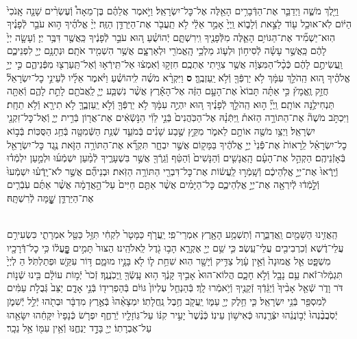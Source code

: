 \documentclass[twoside, openany, parskip=half, 11pt]{book}
\begin{document}
\begin{footnotesize}
\begin{multicols}{2}
\\
וַיֵּ֖לֶךְ מֹשֶׁ֑ה וַיְדַבֵּ֛ר אֶת־הַדְּֿבָרִ֥ים הָאֵ֖לֶּה אֶל־כׇּל־יִשְׂרָאֵֽל׃ וַיֹּ֣אמֶר אֲלֵהֶ֗ם בֶּן־מֵאָה֩ וְֿעֶשְׂרִ֨ים שָׁנָ֤ה אָֽנֹכִי֙ הַיּ֔וֹם לֹֽא־אוּכַ֥ל ע֖וֹד לָצֵ֣את וְֿלָב֑וֹא וַֽיְיָ֙ אָמַ֣ר אֵלַ֔י לֹ֥א תַֽעֲבֹ֖ר אֶת־הַיַּרְדֵּ֥ן הַזֶּֽה׃ יְיָ֨ אֱלֹהֶ֜יךָ ה֣וּא עֹבֵ֣ר לְֿפָנֶ֗יךָ הֽוּא־יַשְׁמִ֞יד אֶת־הַגּוֹיִ֥ם הָאֵ֛לֶּה מִלְּֿפָנֶ֖יךָ וִֽירִשְׁתָּ֑ם יְֿהוֹשֻׁ֗עַ ה֚וּא עֹבֵ֣ר לְֿפָנֶ֔יךָ כַּֽאֲשֶׁ֖ר דִּבֶּ֥ר יְיָ׃
וְֿעָשָׂ֤ה יְיָ֙ לָהֶ֔ם כַּֽאֲשֶׁ֣ר עָשָׂ֗ה לְֿסִיח֥וֹן וּלְע֛וֹג מַלְכֵ֥י הָֽאֱמֹרִ֖י וּלְאַרְצָ֑ם אֲשֶׁ֥ר הִשְׁמִ֖יד אֹתָֽם׃ וּנְתָנָ֥ם יְיָ֖ לִפְנֵיכֶ֑ם וַֽעֲשִׂיתֶ֣ם לָהֶ֔ם כְּֿכָ֨ל־הַמִּצְוָ֔ה אֲשֶׁ֥ר צִוִּ֖יתִי אֶתְכֶֽם׃ חִזְק֣וּ וְֿאִמְצ֔וּ אַל־תִּֽירְֿא֥וּ וְֿאַל־תַּֽעַרְצ֖וּ מִפְּֿנֵיהֶ֑ם כִּ֣י יְיָ֣ אֱלֹהֶ֗יךָ ה֚וּא הַֽהֹלֵ֣ךְ עִמָּ֔ךְ לֹ֥א יַרְפְּֿךָ֖ וְֿלֹ֥א יַֽעַזְבֶֽךָּ׃ \textbf{ס}
וַיִּקְרָ֨א מֹשֶׁ֜ה לִֽיהוֹשֻׁ֗עַ וַיֹּ֨אמֶר אֵלָ֜יו לְֿעֵינֵ֣י כׇל־יִשְׂרָאֵל֘ חֲזַ֣ק וֶֽאֱמָץ֒ כִּ֣י אַתָּ֗ה תָּבוֹא֙ אֶת־הָעָ֣ם הַזֶּ֔ה אֶל־הָאָ֕רֶץ אֲשֶׁ֨ר נִשְׁבַּ֧ע יְיָ֛ לַֽאֲבֹתָ֖ם לָתֵ֣ת לָהֶ֑ם וְֿאַתָּ֖ה תַּנְחִילֶ֥נָּה אוֹתָֽם׃ וַֽיְיָ֞ ה֣וּא הַֽהֹלֵ֣ךְ לְֿפָנֶ֗יךָ ה֚וּא יִהְיֶ֣ה עִמָּ֔ךְ לֹ֥א יַרְפְּֿךָ֖ וְֿלֹ֣א יַֽעַזְבֶ֑ךָּ לֹ֥א תִירָ֖א וְֿלֹ֥א תֵחָֽת׃ וַיִּכְתֹּ֣ב מֹשֶׁה֘ אֶת־הַתּוֹרָ֣ה הַזֹּאת֒ וַֽיִּתְּֿנָ֗הּ אֶל־הַכֹּֽהֲנִים֙ בְּֿנֵ֣י לֵוִ֔י הַנֹּ֣שְֿׂאִ֔ים אֶת־אֲר֖וֹן בְּֿרִ֣ית יְיָ֑ וְֿאֶל־כׇּל־זִקְנֵ֖י יִשְׂרָאֵֽל׃ וַיְצַ֥ו מֹשֶׁ֖ה אוֹתָ֣ם לֵאמֹ֑ר מִקֵּ֣ץ שֶׁ֣בַע שָׁנִ֗ים בְּֿמֹעֵ֛ד שְֿׁנַ֥ת הַשְּֿׁמִטָּ֖ה בְּֿחַ֥ג הַסֻּכּֽוֹת׃ בְּֿב֣וֹא כׇל־יִשְׂרָאֵ֗ל לֵֽרָאוֹת֙ אֶת־פְּֿֿנֵי֙ יְיָ֣ אֱלֹהֶ֔יךָ בַּמָּק֖וֹם אֲשֶׁ֣ר יִבְחָ֑ר תִּקְרָ֞א אֶת־הַתּוֹרָ֥ה הַזֹּ֛את נֶ֥גֶד כׇּל־יִשְׂרָאֵ֖ל בְּֿאָזְֿנֵיהֶֽם׃ הַקְהֵ֣ל אֶת־הָעָ֗ם הָֽאֲנָשִׁ֤ים וְֿהַנָּשִׁים֙ וְֿהַטַּ֔ף וְֿגֵֽרְֿךָ֖ אֲשֶׁ֣ר בִּשְׁעָרֶ֑יךָ לְֿמַ֨עַן יִשְׁמְֿע֜וּ וּלְמַ֣עַן יִלְמְֿד֗וּ וְֿיָֽרְֿאוּ֙ אֶת־יְיָ֣ אֱלֹֽהֵיכֶ֔ם וְֿשָֽׁמְֿר֣וּ לַֽעֲשׂ֔וֹת אֶת־כׇּל־דִּבְרֵ֖י הַתּוֹרָ֥ה הַזֹּֽאת׃ וּבְנֵיהֶ֞ם אֲשֶׁ֣ר לֹא־יָֽדְֿע֗וּ יִשְׁמְֿעוּ֙ וְֿלָ֣מְֿד֔וּ לְֿיִרְאָ֖ה אֶת־יְיָ֣ אֱלֹֽהֵיכֶ֑ם כׇּל־הַיָּמִ֗ים אֲשֶׁ֨ר אַתֶּ֤ם חַיִּים֙ עַל־הָ֣אֲדָמָ֔ה אֲשֶׁ֨ר אַתֶּ֜ם עֹֽבְֿרִ֧ים אֶת־הַיַּרְדֵּ֛ן שׇׇׇׇׇׇָׁ֖מָּה לְֿרִשְׁתָּֽהּ׃

\\
הַֽאֲזִ֥ינוּ הַשָּׁמַ֖יִם וַֽאֲדַבֵּ֑רָה וְֿתִשְׁמַ֥ע הָאָ֖רֶץ אִמְרֵי־פִֽי׃
יַֽעֲרֹ֤ף כַּמָּטָר֙ לִקְחִ֔י תִּזַּ֥ל כַּטַּ֖ל אִמְרָתִ֑י
כִּשְׂעִירִ֣ם עֲלֵי־דֶ֔שֶׁא וְֿכִרְבִיבִ֖ים עֲלֵי־עֵֽשֶׂב׃
כִּ֛י שֵׁ֥ם יְיָ֖ אֶקְרָ֑א הָב֥וּ גֹ֖דֶל לֵֽאלֹהֵֽינוּ׃
הַצּוּר֙ תָּמִ֣ים פׇׇׇׇׇׇׇׇׇׇָּֽעֳל֔וֹ כִּ֥י כׇל־דְּֿֿרָכָ֖יו מִשְׁפָּ֑ט
אֵ֤ל אֱמוּנָה֙ וְֿאֵ֣ין עָ֔וֶל צַדִּ֥יק וְֿיָשָׁ֖ר הֽוּא׃
שִׁחֵ֥ת ל֛וֹ לֹ֖א בָּנָ֣יו מוּמָ֑ם דּ֥וֹר עִקֵּ֖שׁ וּפְתַלְתֹּֽל׃
הַ לְיְיָ֙ תִּגְמְֿלוּ־זֹ֔את עַ֥ם נָבָ֖ל וְֿלֹ֣א חָכָ֑ם
הֲלוֹא־הוּא֙ אָבִ֣יךָ קָּנֶ֔ךָ ה֥וּא עָֽשְֿׂךָ֖ וַֽיְכֹֽנֲנֶֽךָ׃
זְֿכֹר֙ יְֿמ֣וֹת עוֹלָ֔ם בִּ֖ינוּ שְֿׁנ֣וֹת דֹּר וָדֹ֑ר
שְֿׁאַ֤ל אָבִ֨יךָ֙ וְֿיַגֵּ֔דְֿךָ זְֿקֵנֶ֖יךָ וְֿיֹ֥אמְֿרוּ לָֽךְ׃
בְּֿהַנְחֵ֤ל עֶלְיוֹן֙ גּוֹיִ֔ם בְּֿהַפְרִיד֖וֹ בְּֿנֵ֣י אָדָ֑ם
יַצֵּב֙ גְּֿבֻלֹ֣ת עַמִּ֔ים לְֿמִסְפַּ֖ר בְּֿנֵ֥י יִשְׂרָאֵֽל׃
כִּ֛י חֵ֥לֶק יְיָ֖ עַמּ֑וֹ יַֽעֲקֹ֖ב חֶ֥בֶל נַֽחֲלָתֽוֹ׃
יִמְצָאֵ֨הוּ֙ בְּֿאֶ֣רֶץ מִדְבָּ֔ר וּבְתֹ֖הוּ יְֿלֵ֣ל יְֿשִׁמֹ֑ן
יְֿסֹֽבֲבֶ֨נְהוּ֙ יְֿב֣וֹנֲנֵ֔הוּ יִצְּֿרֶ֖נְהוּ כְּֿאִישׁ֥וֹן עֵינֽוֹ׃
כְּֿנֶ֨שֶׁר֙ יָעִ֣יר קִנּ֔וֹ עַל־גּֽוֹזָלָ֖יו יְֿרַחֶ֑ף
יִפְרֹ֤שׂ כְּֿנָפָיו֙ יִקָּחֵ֔הוּ יִשָּׂאֵ֖הוּ עַל־אֶבְרָתֽוֹ׃
יְיָ֖ בָּדָ֣ד יַנְחֶ֑נּוּ וְֿאֵ֥ין עִמּ֖וֹ אֵ֥ל נֵכָֽר׃


\end{multicols}
\end{footnotesize}
\end{document}
